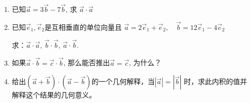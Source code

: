 \begin{ex}
\begin{enumerate}
    \item 已知$\vec{a}=3\vec{b}-7\vec{b}$, 求
    $\vec{a}\cdot \vec{a}$
\item  已知$\vec{e}_1,\vec{e}_2$是互相垂直的单位向量且
   $ \vec{a}=2\vec{e}_1+\vec{e}_2,\quad \vec{b}=12\vec{e}_1-4\vec{e}_2$
   
   求：$\vec{a}\cdot \vec{a}$, $\vec{b}\cdot \vec{b}$, $\vec{a}\cdot \vec{b}$.

   \item 如果$\vec{a}\cdot \vec{b}=\vec{c}\cdot \vec{b}$, 那么能否推出$\vec{a}=\vec{c}$, 为什么？
    \item 给出$(\vec{a}+\vec{b})\cdot (\vec{a}-\vec{b})$的一个几何解释，当$|\vec{a}|=|\vec{b}|$
    时，求此内积的值并解释这个结果的几何意义。
\end{enumerate}
\end{ex}

